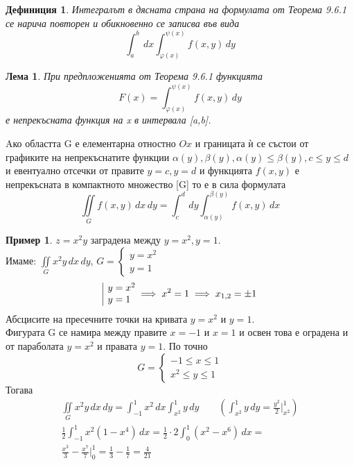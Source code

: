 \documentclass[a4paper,fleqn,12pt]{article}
\newtheorem{lemma}{Лема}[subsection]
\newtheorem{definition}{Дефиниция}[subsection]
\theoremstyle{definition}
\newtheorem{example}{Пример}[subsection]
\begin{document}
\begin{definition}
Интегралът в дясната страна на формулата от Теорема 9.6.1 се нарича повторен и обикновенно се записва във вида
$$\int_a ^b \, dx \int_{\varphi(x)} ^{\psi(x)}  f(x,y) \, dy$$ 
\end{definition}

\begin{lemma}
При предпложенията от Теорема 9.6.1 функцията 
$$F(x) = \int_{\varphi(x)} ^{\psi(x)}  f(x,y) \, dy$$
е непрекъсната функция на x в интервала [a,b]. 
\end{lemma}
Aко областта G е елементарна отностно $Ox$ и границата ѝ се състои от графиките на непрекъснатите функции $\alpha (y), \beta(y), \alpha (y) \leq \beta(y), c \leq y \leq d$ и евентуално отсечки от правите $y = c, y = d$ и функцията $f(x,y)$ е непрекъсната в компактното множество [G] то е в сила формулата 
$$\iint\limits_{G} f(x,y) \, dx \, dy = \int_c ^d \, dy  \int_{\alpha(y)} ^{\beta(y)}  f(x,y) \, dx$$

\begin{example}
$z = x^2y$ заградена между $y = x^2, y = 1$. \\
Имаме: $\iint\limits_{G} x^2y \,dx \, dy$, 
$G =
\begin{cases}
y = x^2 \\
y = 1
\end{cases}$ 
$$
\begin{array}{|l@{}}
y = x^2 \\
y = 1
\end{array} \implies
x^2 = 1 \implies x_{1,2} = \pm 1 
$$
Абсцисите на пресечните точки на кривата $y = x^2$ и $y = 1$. \\
Фигурата G се намира между правите $x = -1$ и $x = 1$ и освен това е оградена и от параболата $y = x^2$ и правата $y = 1$.  По точно
$$G = 
\begin{cases}
-1 \leq x \leq 1 \\
x^2 \leq y \leq 1
\end{cases}$$
Тогава 
\begin{gather*}
\iint\limits_{G} x^2y \,dx \, dy = \int_{-1} ^ 1 x^2 \, dx \int _{x^2} ^ 1 y \, dy \qquad 
\left( \int _{x^2} ^ 1 y \, dy  = \frac{y^2}{2}  \Big|_{x^2} ^ 1\right) \\
 \frac{1}{2} \int_{-1} ^1 x^2 (1-x^4) \, dx = \frac{1}{2} \cdot 2 \int_0 ^1 (x^2 - x^6) \, dx =  \\
\frac{x^3}{3} - \frac{x^7}{7} \Big|_0 ^ 1 = \frac{1}{3} - \frac{1}{7} = \frac{4}{21}
\end{gather*}

\end{example}
\end{document}
